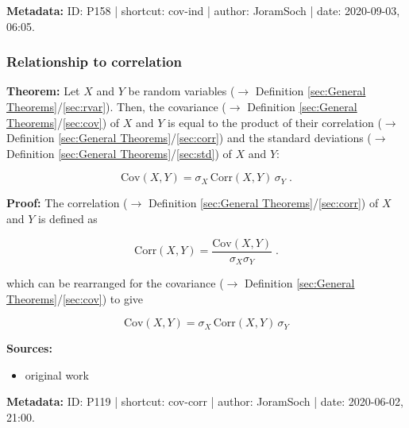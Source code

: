\documentclass[a4paper,12pt,twoside]{book}
\begin{document}
\vspace{1em}
\textbf{Metadata:} ID: P158 | shortcut: cov-ind | author: JoramSoch | date: 2020-09-03, 06:05.
\vspace{1em}



\subsubsection[\textbf{Relationship to correlation}]{Relationship to correlation} \label{sec:cov-corr}
\setcounter{equation}{0}

\textbf{Theorem:} Let $X$ and $Y$ be random variables ($\rightarrow$ Definition \ref{sec:General Theorems}/\ref{sec:rvar}). Then, the covariance ($\rightarrow$ Definition \ref{sec:General Theorems}/\ref{sec:cov}) of $X$ and $Y$ is equal to the product of their correlation ($\rightarrow$ Definition \ref{sec:General Theorems}/\ref{sec:corr}) and the standard deviations ($\rightarrow$ Definition \ref{sec:General Theorems}/\ref{sec:std}) of $X$ and $Y$:

\begin{equation} \label{eq:cov-corr-cov-corr}
\mathrm{Cov}(X,Y) = \sigma_X \, \mathrm{Corr}(X,Y) \, \sigma_Y \; .
\end{equation}


\vspace{1em}
\textbf{Proof:} The correlation ($\rightarrow$ Definition \ref{sec:General Theorems}/\ref{sec:corr}) of $X$ and $Y$ is defined as

\begin{equation} \label{eq:cov-corr-corr}
\mathrm{Corr}(X,Y) = \frac{\mathrm{Cov}(X,Y)}{\sigma_X \sigma_Y} \; .
\end{equation}

which can be rearranged for the covariance ($\rightarrow$ Definition \ref{sec:General Theorems}/\ref{sec:cov}) to give

\begin{equation} \label{eq:cov-corr-cov-corr-qed}
\mathrm{Cov}(X,Y) = \sigma_X \, \mathrm{Corr}(X,Y) \, \sigma_Y
\end{equation}


\vspace{1em}
\textbf{Sources:}
\begin{itemize}
\item original work\end{itemize}


\vspace{1em}
\textbf{Metadata:} ID: P119 | shortcut: cov-corr | author: JoramSoch | date: 2020-06-02, 21:00.
\vspace{1em}
\end{document}
